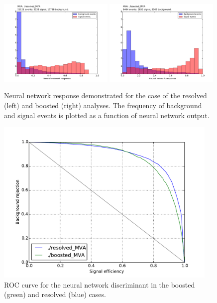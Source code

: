 \begin{figure}[h]
\begin{center}
\includegraphics[width=0.49\textwidth]{plots/resolved_MVA_hist.pdf}
\includegraphics[width=0.49\textwidth]{plots/boosted_MVA_hist.pdf}
\caption{Neural network response demonstrated for the case of the resolved (left) and boosted (right) analyses. The frequency of background and signal events is plotted as a function of neural network output.}
\label{fig:nnresponse}
\end{center}
\end{figure}

\begin{figure}[h]
\begin{center}
\includegraphics[width=0.95\textwidth]{plots/example_roc.pdf}
\caption{ROC curve for the neural network discriminant in the boosted (green) and resolved (blue) cases.}
\label{fig:exampleroc}
\end{center}
\end{figure}

